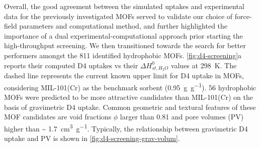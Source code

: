 Overall, the good agreement between the simulated uptakes and experimental data
for the previously investigated MOFs served to validate our choice of
force-field parameters and computational method, and further highlighted the
importance of a dual experimental-computational approach prior starting the
high-throughput screening. We then transitioned towards the search for better
performers amongst the 811 identified hydrophobic MOFs. \cref{fig:d4-screening}a
reports their computed D4 uptakes vs their \(\Delta H_{st,H_{2}O}^{0}\) values at
\SI{298}{\kelvin}. The dashed line represents the current known upper limit for
D4 uptake in MOFs, considering MIL-101(Cr) as the benchmark sorbent
(\SI{0.95}{\gram\per\gram})\citep{gargiuloChromiumbasedMIL101Metal2019}. 56
hydrophobic MOFs were predicted to be more attractive candidates than
MIL-101(Cr) on the basis of gravimetric D4 uptake. Common geometric and textural
features of these MOF candidates are void fractions \(\phi\) larger than 0.81
and pore volumes (PV) higher than \textasciitilde
\SI{1.7}{\centi\metre\cubed\per\gram}. Typically, the relationship between
gravimetric D4 uptake and PV is shown in \cref{fig:d4-screening-grav-volum}.
 
